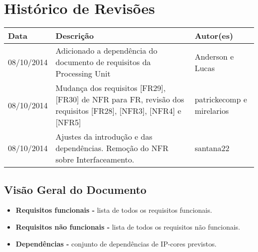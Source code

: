 \documentclass{article}
\begin{document}
\section*{\center Histórico de Revisões}
\vspace*{1cm}
\begin{table}[ht]
	\centering
	\begin{tabular}[pos]{|m{2cm} | m{7.2cm} | m{3.8cm}|} \hline \cellcolor[gray]{0.9}
		
		\textbf{Data} & \cellcolor[gray]{0.9}\textbf{Descrição} & \cellcolor[gray]{0.9} \textbf{Autor(es)}\\ \hline
		
		\small 08/10/2014 & \small Adicionado a dependência do documento de requisitos da Processing Unit & \small Anderson e Lucas \\ \hline 
		
		\small 08/10/2014 & \small Mudança dos requisitos [FR29], [FR30] de NFR para FR, revisão dos requisitos [FR28], [NFR3], [NFR4] e [NFR5] & \small patrickecomp e mirelarios \\ \hline
		
		\small 08/10/2014 & \small Ajustes da introdução e das dependências. Remoção do NFR sobre Interfaceamento. & \small santana22 \\ \hline
		
	\end{tabular}
\end{table}
		
\tableofcontents
\newpage
		
    
		
	\subsection{Visão Geral do Documento}
		\begin{itemize}
			\item \textbf{Requisitos funcionais -} lista de todos os requisitos funcionais.
			\item \textbf{Requisitos não funcionais -} lista de todos os requisitos não funcionais.
			\item \textbf{Dependências -} conjunto de dependências de IP-cores previstos.
		\end{itemize}
		
\end{document}
